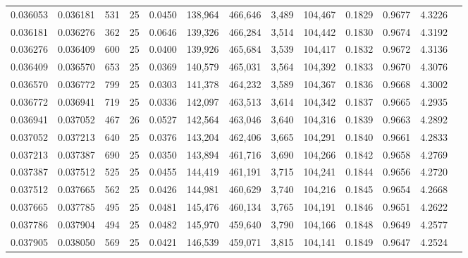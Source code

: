 \begin{tabular}{rrrrrrrrrrrrr}
0.036053 & 0.036181 &   531 &  25 &                                     0.0450 & 138,964 & 466,646 &   3,489 & 104,467 & 0.1829 & 0.9677 & 4.3226 \\
0.036181 & 0.036276 &   362 &  25 &                                     0.0646 & 139,326 & 466,284 &   3,514 & 104,442 & 0.1830 & 0.9674 & 4.3192 \\
0.036276 & 0.036409 &   600 &  25 &                                     0.0400 & 139,926 & 465,684 &   3,539 & 104,417 & 0.1832 & 0.9672 & 4.3136 \\
0.036409 & 0.036570 &   653 &  25 &                                     0.0369 & 140,579 & 465,031 &   3,564 & 104,392 & 0.1833 & 0.9670 & 4.3076 \\
0.036570 & 0.036772 &   799 &  25 &                                     0.0303 & 141,378 & 464,232 &   3,589 & 104,367 & 0.1836 & 0.9668 & 4.3002 \\
0.036772 & 0.036941 &   719 &  25 &                                     0.0336 & 142,097 & 463,513 &   3,614 & 104,342 & 0.1837 & 0.9665 & 4.2935 \\
0.036941 & 0.037052 &   467 &  26 &                                     0.0527 & 142,564 & 463,046 &   3,640 & 104,316 & 0.1839 & 0.9663 & 4.2892 \\
0.037052 & 0.037213 &   640 &  25 &                                     0.0376 & 143,204 & 462,406 &   3,665 & 104,291 & 0.1840 & 0.9661 & 4.2833 \\
0.037213 & 0.037387 &   690 &  25 &                                     0.0350 & 143,894 & 461,716 &   3,690 & 104,266 & 0.1842 & 0.9658 & 4.2769 \\
0.037387 & 0.037512 &   525 &  25 &                                     0.0455 & 144,419 & 461,191 &   3,715 & 104,241 & 0.1844 & 0.9656 & 4.2720 \\
0.037512 & 0.037665 &   562 &  25 &                                     0.0426 & 144,981 & 460,629 &   3,740 & 104,216 & 0.1845 & 0.9654 & 4.2668 \\
0.037665 & 0.037785 &   495 &  25 &                                     0.0481 & 145,476 & 460,134 &   3,765 & 104,191 & 0.1846 & 0.9651 & 4.2622 \\
0.037786 & 0.037904 &   494 &  25 &                                     0.0482 & 145,970 & 459,640 &   3,790 & 104,166 & 0.1848 & 0.9649 & 4.2577 \\
0.037905 & 0.038050 &   569 &  25 &                                     0.0421 & 146,539 & 459,071 &   3,815 & 104,141 & 0.1849 & 0.9647 & 4.2524 \\

\end{tabular}
